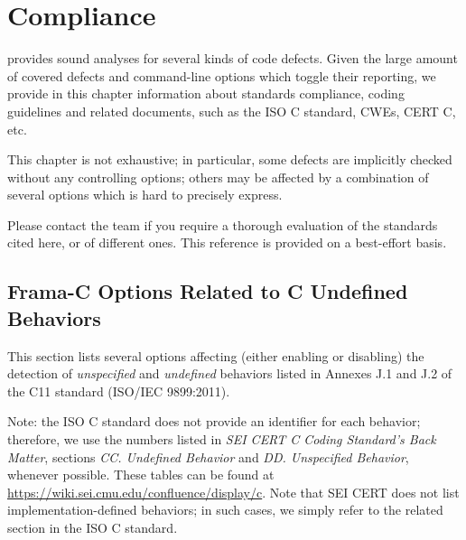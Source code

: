 
\chapter{Compliance}
\label{user-compliance}

\newcommand{\CWE}[1]{\href{https://cwe.mitre.org/data/definitions/#1.html}{CWE-#1}}

\let\oldlongtable\longtable
\let\endoldlongtable\endlongtable
\renewenvironment{longtable}{\rowcolors{2}{white}{lightgray}\oldlongtable} {
\endoldlongtable}

\FramaC provides sound analyses for several kinds of code defects.
Given the large amount of covered defects and command-line options which
toggle their reporting, we provide in this chapter information about standards
compliance, coding guidelines and related documents, such as the ISO C standard,
CWEs, CERT C, etc.

This chapter is not exhaustive; in particular, some defects are implicitly
checked without any controlling options; others may be affected by
a combination of several options which is hard to precisely express.

Please contact the \FramaC team if you require a thorough evaluation of the
standards cited here, or of different ones. This reference is provided on a
best-effort basis.

\section{Frama-C Options Related to C Undefined Behaviors}

This section lists several \FramaC options affecting (either enabling or
disabling) the detection of {\em unspecified} and {\em undefined} behaviors
listed in Annexes J.1 and J.2 of the C11 standard (ISO/IEC 9899:2011).

Note: the ISO C standard does not provide an identifier for each behavior;
therefore, we use the numbers listed in
{\em SEI CERT C Coding Standard's Back Matter}, sections
{\em CC. Undefined Behavior} and {\em DD. Unspecified Behavior}, whenever
possible. These tables can be found at
\url{https://wiki.sei.cmu.edu/confluence/display/c}.
Note that SEI CERT does not list implementation-defined behaviors; in such
cases, we simply refer to the related section in the ISO C standard.

